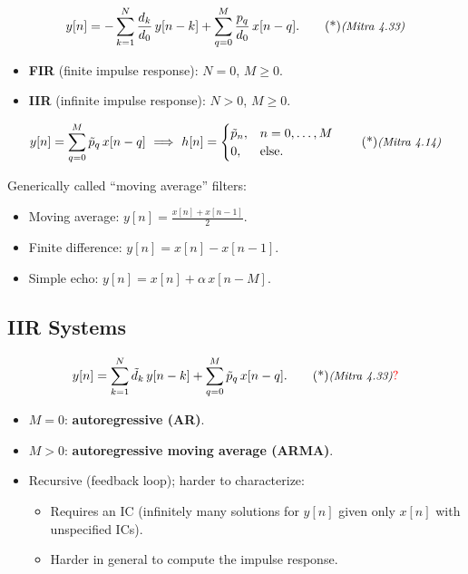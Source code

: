\documentclass[handout_subfiles_root.tex]{subfiles}
\begin{document}
\begin{equation}
y[n] = -\sum_{k=1}^{N}\frac{d_k}{d_0}\,y[n-k] + \sum_{q=0}^{M}\frac{p_q}{d_0}\,x[n-q].\MitraTag{4.33}
\end{equation}

\begin{itemize}
  \item \textbf{FIR} (finite impulse response): $N=0$, $M\ge 0$.
  \item \textbf{IIR} (infinite impulse response): $N>0$, $M\ge 0$.
\end{itemize}


\begin{equation}
y[n] = \sum_{q=0}^{M} \tilde{p}_q\,x[n-q] \ \Longrightarrow\
  h[n] = \begin{cases}\tilde{p}_n, & n=0,\ldots,M \\ 0, & \text{else.}\end{cases}\MitraTag{4.14}
\end{equation}

Generically called ``moving average'' filters:
\begin{itemize}
  \item Moving average: $\displaystyle y[n] = \frac{x[n]+x[n-1]}{2}$.
  \item Finite difference: $y[n] = x[n] - x[n-1]$.
  \item Simple echo: $y[n] = x[n] + \alpha\,x[n-M]$.
\end{itemize}

\subsection{IIR Systems}
\begin{equation}
y[n] = \sum_{k=1}^{N} \tilde{d}_k\,y[n-k] + \sum_{q=0}^{M} \tilde{p}_q\,x[n-q].\MitraEqDoubtTag{4.33}
\end{equation}
\begin{itemize}
  \item $M=0$: \textbf{autoregressive (AR)}.
  \item $M>0$: \textbf{autoregressive moving average (ARMA)}.
  \item Recursive (feedback loop); harder to characterize:
  \begin{itemize}
    \item Requires an IC (infinitely many solutions for $y[n]$ given only
    $x[n]$ with unspecified ICs).
    \item Harder in general to compute the impulse response.
  \end{itemize}
\end{itemize}
\end{document}
